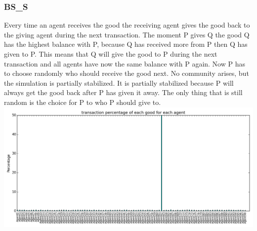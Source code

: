 \documentclass[twoside,openright]{uva-bachelor-thesis}
\begin{document}
\subsubsection{BS\_S}
Every time an agent receives the good the receiving agent gives the good back to the giving agent during the next transaction. The moment P gives Q the good Q has the highest balance with P, because Q has received more from P then Q has given to P. This means that Q will give the good to P during the next transaction and all agents have now the same balance with P again. Now P has to choose randomly who should receive the good next. No community arises, but the simulation is partially stabilized. It is partially stabilized because P will always get the good back after P has given it away. The only thing that is still random is the choice for P to who P should give to. \\
\includegraphics[scale=0.5]{experiment_images/BR_BS_S}
\end{document}

